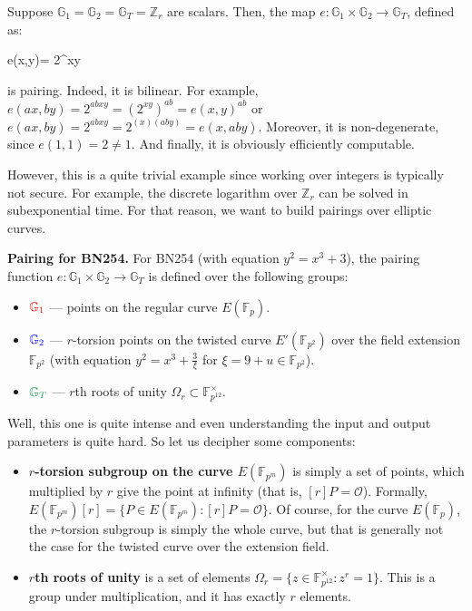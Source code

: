\documentclass[../lecture-notes-148x210.tex]{subfiles}
\begin{document}
\begin{example}
    Suppose $\mathbb{G}_1=\mathbb{G}_2=\mathbb{G}_T=\mathbb{Z}_r$ are scalars. Then, the map $e: \mathbb{G}_1 \times \mathbb{G}_2 \to \mathbb{G}_T$, defined as:
    \begin{xequation*}
        e(x,y)= 2^{xy}
    \end{xequation*}
    is pairing. Indeed, it is bilinear. For example, $e(ax,by) = 2^{abxy} = (2^{xy})^{ab} = e(x,y)^{ab}$ or $e(ax,by)=2^{abxy}=2^{(x)(aby)}=e(x,aby)$. Moreover, it is non-degenerate, since $e(1,1)=2 \neq 1$. And finally, it is obviously efficiently computable.

    However, this is a quite trivial example since working over integers is typically not secure. For example, the discrete logarithm over $\mathbb{Z}_r$ can be solved in subexponential time. For that reason, we want to build pairings over elliptic curves.
\end{example}

\begin{example}
    \textbf{Pairing for BN254.} For BN254 (with equation $y^2=x^3+3$), the pairing function $e: \mathbb{G}_1 \times \mathbb{G}_2 \to \mathbb{G}_T$ is defined over the following groups:
    \begin{itemize}
        \item $\textcolor{red}{\mathbb{G}_1}$ --- points on the regular curve $E(\mathbb{F}_p)$.
        \item $\textcolor{blue}{\mathbb{G}_2}$ --- $r$-torsion points on the twisted curve $E'(\mathbb{F}_{p^2})$ over the field extension $\mathbb{F}_{p^2}$ (with equation $y^2 = x^3+\frac{3}{\xi}$ for $\xi=9+u \in \mathbb{F}_{p^2}$).
        \item $\textcolor{ForestGreen}{\mathbb{G}_T}$ --- $r$th roots of unity $\Omega_r \subset \mathbb{F}_{p^{12}}^{\times}$.
    \end{itemize}

    Well, this one is quite intense and even understanding the input and output parameters is quite hard. So let us decipher some components:
    \begin{itemize}
        \item \textbf{$r$-torsion subgroup on the curve $E(\mathbb{F}_{p^m})$} is simply a set of points, which multiplied by $r$ give the point at infinity (that is, $[r]P=\mathcal{O}$). Formally, $E(\mathbb{F}_{p^m})[r] = \{P \in E(\mathbb{F}_{p^m}): [r]P = \mathcal{O}\}$. Of course, for the curve $E(\mathbb{F}_p)$, the $r$-torsion subgroup is simply the whole curve, but that is generally not the case for the twisted curve over the extension field.
        \item \textbf{$r$th roots of unity} is a set of elements $\Omega_r = \{z \in \mathbb{F}_{p^{12}}^{\times}: z^r=1\}$. This is a group under multiplication, and it has exactly $r$ elements.
    \end{itemize}
\end{example}
\end{document}
